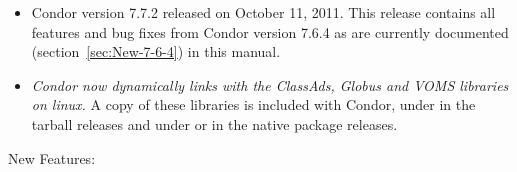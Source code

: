 \begin{itemize}

\item Condor version 7.7.2 released on October 11, 2011.
This release contains all features and bug fixes from Condor version 7.6.4
as are currently documented (section~\ref{sec:New-7-6-4}) in this manual. 

\item
\emph{Condor now dynamically links with the ClassAds, Globus and VOMS libraries on
linux.}
A copy of these libraries is included with Condor, under
 in the tarball releases and under
 or  in the native package
releases.

\end{itemize}


\noindent New Features:

